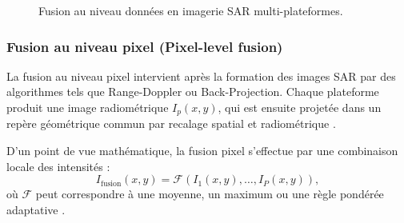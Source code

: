 \begin{figure}[H]
\centering
{}
\caption{Fusion au niveau données en imagerie SAR multi-plateformes.}
\label{fig:data_level_fusion}
\end{figure}




\subsubsection{Fusion au niveau pixel (Pixel-level fusion)}

La fusion au niveau pixel intervient après la formation des images SAR par des algorithmes tels que Range-Doppler ou Back-Projection.  
Chaque plateforme produit une image radiométrique $I_p(x,y)$, qui est ensuite projetée dans un repère géométrique commun par recalage spatial et radiométrique \cite{curlander1991}.

D’un point de vue mathématique, la fusion pixel s’effectue par une combinaison locale des intensités :
\begin{equation}
I_{\text{fusion}}(x,y) = \mathcal{F}\left( I_1(x,y), \dots, I_P(x,y) \right),
\end{equation}
où $\mathcal{F}$ peut correspondre à une moyenne, un maximum ou une règle pondérée adaptative \cite{oliver1998}.

